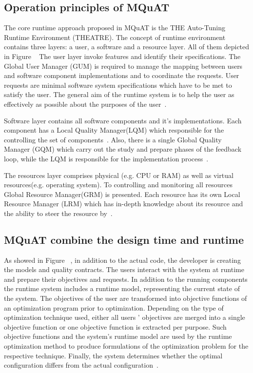 \subsection{Operation principles of MQuAT}
The core runtime approach proposed in MQuAT is the THE Auto-Tuning Runtime Environment (THEATRE)\cite{gotz10, gotz12}.
The concept of runtime environment  contains three layers: a user, a software and a resource layer. All of them depicted in Figure ~\label{ThreeLayersOfMQuAT}
The user layer invoke features and identify their specifications. The  Global  User  Manager  (GUM)  is  required to manage the mapping between users and software component implementations and to coordinate  the  requests. User requests are minimal software system specifications which have to be met to satisfy the user. The general aim of the runtime system is to help the user as effectively as possible about the purposes of the user~\cite{gotz13}.

Software layer contains all software components and it's implementations. Each component has a Local Quality Manager(LQM) which responsible for the controlling the set of components~\cite{gotz13, ahmad18}. Also, there is a single Global Quality Manager (GQM) which carry out the study and prepare phases of the feedback loop, while the LQM is responsible for the implementation process~\cite{gotz13}.

The resources layer comprises physical (e.g. CPU or RAM) as well as virtual resources(e.g. operating system).
To controlling and monitoring all resources Global Resource Manager(GRM) is presented. Each resource  has its own Local Resource Manager (LRM) which has in-depth knowledge about its resource and the ability to steer the resource by~\cite{gotz13, ahmad18}.

\subsection{MQuAT combine the design time and runtime}
As showed in Figure ~\label{CombinedMQuAT}, in addition to the actual code, the developer is creating the models and quality contracts. The users interact with the system at runtime and prepare their objectives and requests. 
In addition to the running components the runtime system includes a runtime model, representing the current state of the system. The objectives of the user are transformed into objective functions of an optimization program prior to optimization. Depending on the type of optimization technique used, either all users ' objectives are merged into a single objective function or one objective function is extracted per purpose. Such objective functions and the system's runtime model are used by the runtime optimization method to produce formulations of the optimization problem for the respective technique. Finally, the system determines whether the optimal configuration differs from the actual configuration~\cite{gotz13, ahmad18}.

